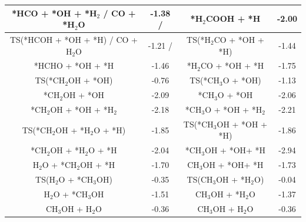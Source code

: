 \begin{table}[htbp!]
\begin{center}
{\begin{tabular}{|* {4}{c|}}
 *HCO + *OH + *H$_2$ \quad / \quad CO + *H$_2$O       &-1.38 \quad / \quad 0.03   &*H$_2$COOH + *H               &-2.00    \\ \hline     
TS(*HCOH + *OH + *H) \quad / \quad CO + H$_2$O       &-1.21 \quad / \quad 0.91   &TS(*H$_2$CO + *OH + *H)       &-1.44    \\ \hline       
 *HCHO + *OH + *H                        &-1.46&    *H$_2$CO + *OH + *H                      &-1.75    \\ \hline       
TS(*CH$_2$OH + *OH)                    &-0.76&      TS(*CH$_3$O + *OH)                      &-1.13    \\ \hline       
 *CH$_2$OH + *OH                        &-2.09&    *CH$_3$O + *OH                          &-2.06    \\ \hline     
 *CH$_2$OH + *OH + *H$_2$                &-2.18&    *CH$_3$O + *OH + *H$_2$                  &-2.21    \\ \hline      
TS(*CH$_2$OH + *H$_2$O + *H)            &-1.85&      TS(*CH$_3$OH + *OH + *H)                 &-1.86    \\ \hline      
 *CH$_2$OH + *H$_2$O + *H                &-2.04&    *CH$_3$OH + *OH+ *H                     &-2.94    \\ \hline      
H$_2$O + *CH$_2$OH + *H                  &-1.70&      CH$_3$OH + *OH+ *H                       &-1.73    \\ \hline      
TS(H$_2$O + *CH$_3$OH)                  &-0.35&      TS(CH$_3$OH + *H$_2$O)                   &-0.04    \\ \hline
H$_2$O + *CH$_3$OH                      &-1.51&      CH$_3$OH + *H$_2$O                       &-1.37    \\ \hline
CH$_3$OH + H$_2$O                        &-0.36&      CH$_3$OH + H$_2$O                         &-0.36    \\ \hline


  \end{tabular}
}  
  \end{center}
\end{table} 


